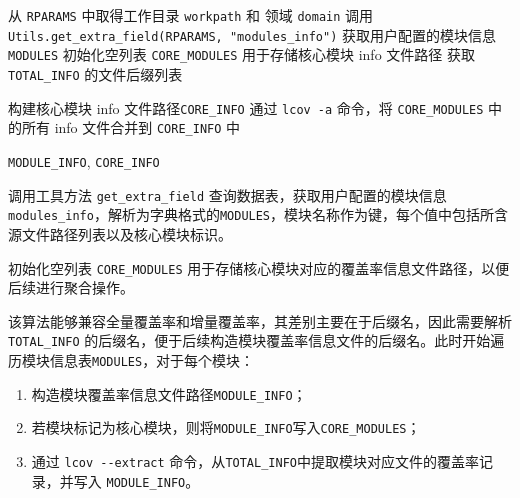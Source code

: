 \begin{algorithm}[ht]
\caption{细粒度分析-解析任务层-模块覆盖率分析算法}
\label{algo:5.10}

从 \texttt{RPARAMS} 中取得工作目录 \texttt{workpath} 和 领域 \texttt{domain} \;
调用 \texttt{Utils.get\_extra\_field(RPARAMS, "modules\_info")} 获取用户配置的模块信息 \texttt{MODULES} \;
初始化空列表 \texttt{CORE\_MODULES} 用于存储核心模块 info 文件路径\;
获取 \texttt{TOTAL\_INFO} 的文件后缀列表\;


构建核心模块 info 文件路径\texttt{CORE\_INFO} \;
通过 \texttt{lcov -a} 命令，将 \texttt{CORE\_MODULES} 中的所有 info 文件合并到 \texttt{CORE\_INFO} 中 \;

\Return \texttt{MODULE\_INFO}, \texttt{CORE\_INFO}
\end{algorithm}

调用工具方法 \verb|get_extra_field| 查询数据表，获取用户配置的模块信息 \verb|modules_info|，解析为字典格式的\verb|MODULES|，模块名称作为键，每个值中包括所含源文件路径列表以及核心模块标识。

初始化空列表 \verb|CORE_MODULES| 用于存储核心模块对应的覆盖率信息文件路径，以便后续进行聚合操作。

该算法能够兼容全量覆盖率和增量覆盖率，其差别主要在于后缀名，因此需要解析 \verb|TOTAL_INFO| 的后缀名，便于后续构造模块覆盖率信息文件的后缀名。此时开始遍历模块信息表\verb|MODULES|，对于每个模块：

\begin{enumerate}
    \item 构造模块覆盖率信息文件路径\verb|MODULE_INFO|；
    \item 若模块标记为核心模块，则将\verb|MODULE_INFO|写入\verb|CORE_MODULES|；
    \item 通过 \verb|lcov --extract| 命令，从\verb|TOTAL_INFO|中提取模块对应文件的覆盖率记录，并写入 \verb|MODULE_INFO|。
\end{enumerate}

